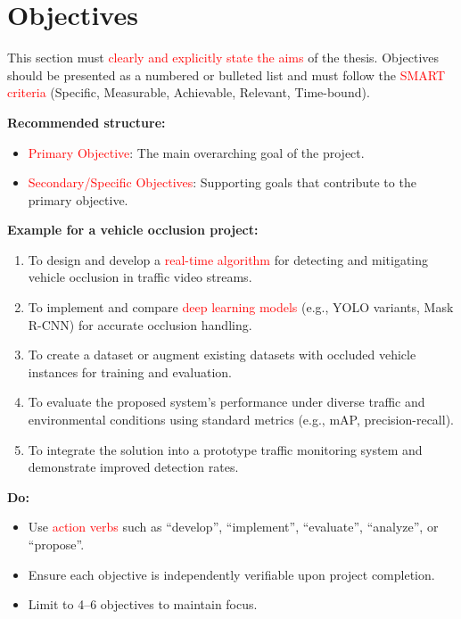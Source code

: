 \documentclass[12pt,a4paper]{report}
\theoremstyle{definition}
\theoremstyle{remark}
\begin{document}
\section{Objectives}
\label{sec:objectives}

This section must \textcolor{red}{clearly and explicitly state the aims} of the thesis. Objectives should be presented as a numbered or bulleted list and must follow the \textcolor{red}{SMART criteria} (Specific, Measurable, Achievable, Relevant, Time-bound).

\noindent \textbf{Recommended structure:}
\begin{itemize}
    \item \textcolor{red}{Primary Objective}: The main overarching goal of the project.
    \item \textcolor{red}{Secondary/Specific Objectives}: Supporting goals that contribute to the primary objective.
\end{itemize}

\noindent \textbf{Example for a vehicle occlusion project:}
\begin{enumerate}
    \item To design and develop a \textcolor{red}{real-time algorithm} for detecting and mitigating vehicle occlusion in traffic video streams.
    \item To implement and compare \textcolor{red}{deep learning models} (e.g., YOLO variants, Mask R-CNN) for accurate occlusion handling.
    \item To create a dataset or augment existing datasets with occluded vehicle instances for training and evaluation.
    \item To evaluate the proposed system’s performance under diverse traffic and environmental conditions using standard metrics (e.g., mAP, precision-recall).
    \item To integrate the solution into a prototype traffic monitoring system and demonstrate improved detection rates.
\end{enumerate}

\noindent \textbf{Do:}
\begin{itemize}
    \item Use \textcolor{red}{action verbs} such as ``develop'', ``implement'', ``evaluate'', ``analyze'', or ``propose''.
    \item Ensure each objective is independently verifiable upon project completion.
    \item Limit to 4--6 objectives to maintain focus.
\end{itemize}
\end{document}
